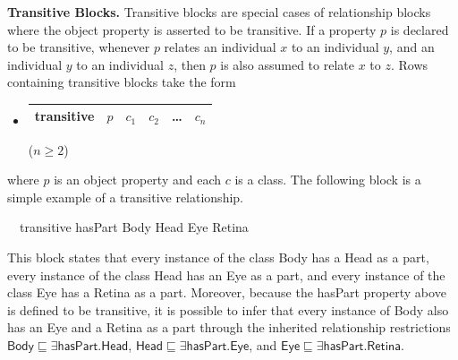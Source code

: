 \documentclass[preprint,number]{elsarticle}
\newcommand{\myblock}[1]{\vspace{12pt}\noindent\textbf{#1}}
\begin{document}
\myblock{Transitive Blocks.} Transitive blocks are special cases of
relationship blocks where the object property is asserted to be
transitive. If a property $p$ is declared to be transitive, whenever
$p$ relates an individual $x$ to an individual $y$, and an
individual $y$ to an individual $z$, then $p$ is also assumed to
relate $x$ to $z$. Rows containing transitive blocks take the form
\begin{itemize}
\item[]
  \begin{tabular}{|l|l|l|l|l|l|}\hline \textsf{transitive} & $p$ & $c_1$
    & $c_2$ & \dots & $c_n$ \\ \hline
  \end{tabular} \hfill ($n \ge 2$)
\end{itemize}
where $p$ is an object property and each $c$ is a class.  The
following block is a simple example of a transitive relationship.
\begin{tabbing}
  ~~\textsf{transitive} \textsf{hasPart} \textsf{Body}
  \textsf{Head} \textsf{Eye} \textsf{Retina}
\end{tabbing} 
This block states that every instance of the class Body has a Head as
a part, every instance of the class Head has an Eye as a part, and
every instance of the class Eye has a Retina as a part. Moreover,
because the \textsf{hasPart} property above is defined to be
transitive, it is possible to infer that every instance of Body also
has an Eye and a Retina as a part through the inherited relationship
restrictions $\textsf{Body} \sqsubseteq \exists \textsf{hasPart}
. \textsf{Head}$, $\textsf{Head} \sqsubseteq \exists \textsf{hasPart}
. \textsf{Eye}$, and $\textsf{Eye} \sqsubseteq \exists
\textsf{hasPart} . \textsf{Retina}$.
\end{document}
